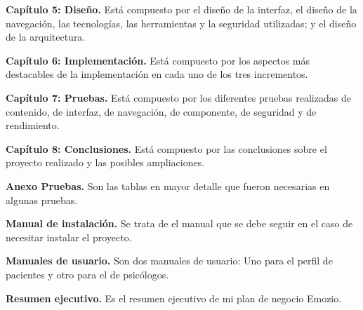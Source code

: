 \textbf{Capítulo 5: Diseño.} Está compuesto por el diseño de la interfaz, el diseño de la navegación, las tecnologías, las herramientas y la seguridad utilizadas; y  el diseño de la arquitectura.\newline


\textbf{Capítulo 6: Implementación.} Está compuesto por los aspectos más destacables de la implementación en cada uno de los tres incrementos.\newline


\textbf{Capítulo 7: Pruebas.} Está compuesto por los diferentes pruebas realizadas de contenido, de interfaz, de navegación, de componente, de seguridad y de rendimiento.\newline


\textbf{Capítulo 8: Conclusiones.} Está compuesto por las conclusiones sobre el proyecto realizado y las posibles ampliaciones.\newline


\textbf{Anexo Pruebas.} Son las tablas en mayor detalle que fueron necesarias en algunas pruebas.\newline


\textbf{Manual de instalación.} Se trata de el manual que se debe seguir en el caso de necesitar instalar el proyecto.\newline


\textbf{Manuales de usuario.} Son dos manuales de usuario: Uno para el perfil de pacientes y otro para el de psicólogos.\newline


\textbf{Resumen ejecutivo.} Es el resumen ejecutivo de mi plan de negocio Emozio.\newline